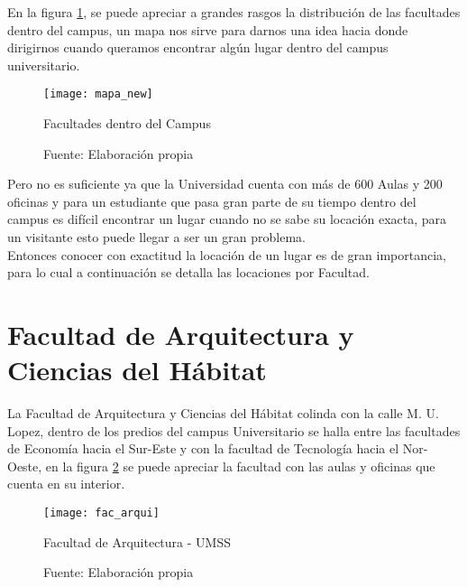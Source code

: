 En la figura \ref{fig:mapa_new}, se puede apreciar a grandes rasgos la distribución de las facultades dentro del campus, un mapa nos sirve para darnos una idea hacia donde dirigirnos cuando queramos encontrar algún lugar dentro del campus universitario.\\


\begin{figure}[H]
  \begin{center}
    \texttt{[image: mapa\_new]}
    \caption{Facultades dentro del Campus}
    \label{fig:mapa_new}
    \caption*{Fuente: Elaboración propia}
  \end{center}
\end{figure}

Pero no es suficiente ya que la Universidad cuenta con más de 600 Aulas y 200 oficinas y para un estudiante que pasa gran parte de su tiempo dentro del campus es difícil encontrar un lugar cuando no se sabe su locación exacta, para un visitante esto puede llegar a ser un gran problema.\\

Entonces conocer con exactitud la locación de un lugar es de gran importancia, para lo cual a continuación se detalla las locaciones por Facultad.

\section{Facultad de Arquitectura y Ciencias del Hábitat}
\label{sec:facultad_arquitectura}

    La Facultad de Arquitectura y Ciencias del Hábitat colinda con la calle M. U. Lopez, dentro de los predios del campus Universitario se halla entre las facultades de Economía hacia el Sur-Este y con la facultad de Tecnología hacia el Nor-Oeste, en la figura \ref{fig:fac_arqui} se puede apreciar la facultad con las aulas y oficinas que cuenta en su interior.

    \begin{figure}[H]
     \begin{center}
       \texttt{[image: fac\_arqui]}
       \caption{Facultad de Arquitectura - UMSS}
       \label{fig:fac_arqui}
       \caption*{Fuente: Elaboración propia}
     \end{center}
    \end{figure}




